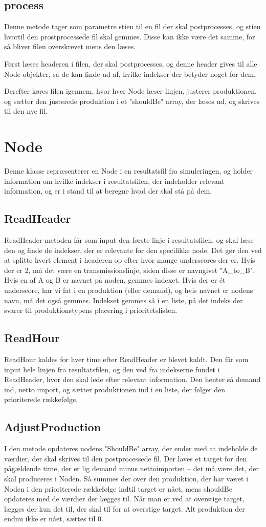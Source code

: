 \documentclass{article}
\begin{document}
\subsection{process}
Denne metode tager som parametre stien til en fil der skal postprocesses, og stien hvortil den prostprocessede fil skal gemmes. Disse kan ikke være det samme, for så bliver filen overskrevet mens den læses. 

Først læses headeren i filen, der skal postprocesses, og denne header gives til alle Node-objekter, så de kan finde ud af, hvilke indekser der betyder noget for dem. 

Derefter køres filen igennem, hvor hver Node læser linjen, justerer produktionen, og sætter den justerede produktion i et "shouldBe" array, der læses ud, og skrives til den nye fil. 

\section{Node}
Denne klasse repræsenterer en Node i en resultatsfil fra simuleringen, og holder information om hvilke indekser i resultatsfilen, der indeholder relevant information, og er i stand til at beregne hvad der skal stå på dem.
\subsection{ReadHeader}
ReadHeader metoden får som input den første linje i resultatsfilen, og skal læse den og finde de indekser, der er relevante for den specifikke node. Det gør den ved at splitte hvert element i headeren op efter hvor mange underscores der er. Hvis der er 2, må det være en transmissionslinje, siden disse er navngivet "A\_to\_B". Hvis en af A og B er navnet på noden, gemmes indexet. Hvis der er ét underscore, har vi fat i en produktion (eller demand), og hvis navnet er nodens navn, må det også gemmes. Indekset gemmes så i en liste, på det indeks der svarer til produktionstypens placering i prioritetslisten.
\subsection{ReadHour}
ReadHour kaldes for hver time efter ReadHeader er blevet kaldt. Den får som input hele linjen fra resultatsfilen, og den ved fra indekserne fundet i ReadHeader, hvor den skal lede efter relevant information. Den henter så demand ind, netto import, og sætter produktionen ind i en liste, der følger den prioriterede rækkefølge.
\subsection{AdjustProduction}
I den metode opdateres nodens "ShouldBe" array, der ender med at indeholde de værdier, der skal skrives til den postprocessede fil. Der laves et target for den pågældende time, der er lig demand minus nettoimporten -- det må være det, der skal produceres i Noden. Så summes der over den produktion, der har været i Noden i den prioriterede rækkefølge indtil target er nået, mens shouldBe opdateres med de værdier der lægges til. Når man er ved at overstige target, lægges der kun det til, der skal til for at overstige target. Alt produktion der endnu ikke er nået, sættes til 0. 
\end{document}
